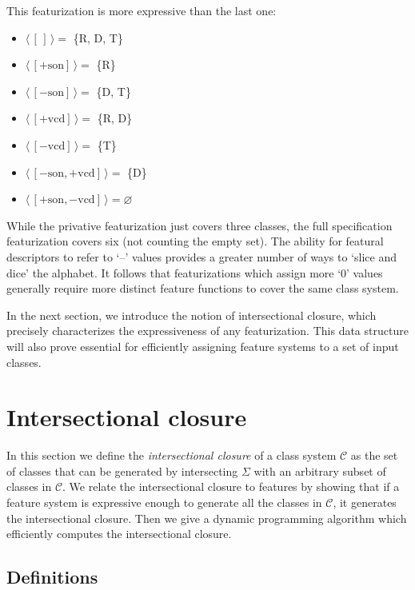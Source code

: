 \documentclass[11pt, oneside]{article}   	%
\begin{document}
\noindent This featurization is more expressive than the last one: \begin{itemize}
    \item $\langle \, [\,] \, \rangle =$ \{R, D, T\}
    \item $\langle \, [+\text{son}] \, \rangle =$ \{R\}
    \item $\langle \, [-\text{son}] \, \rangle =$ \{D, T\}
    \item $\langle \, [+\text{vcd}] \, \rangle =$ \{R, D\}
    \item $\langle \, [-\text{vcd}]  \, \rangle=$ \{T\}
    \item $\langle \, [-\text{son},+\text{vcd}] \, \rangle =$ \{D\}
    \item $\langle \, [+\text{son},-\text{vcd}] \, \rangle = \varnothing$
    \end{itemize}

\noindent While the privative featurization just covers three classes, the full specification featurization covers six (not counting the empty set). The ability for featural descriptors to refer to `--' values provides a greater number of ways to `slice and dice' the alphabet. It follows that featurizations which assign more `$0$' values generally require more distinct feature functions to cover the same class system.

\vspace{\baselineskip} In the next section, we introduce the notion of intersectional closure, which precisely characterizes the expressiveness of any featurization. This data structure will also prove essential for efficiently assigning feature systems to a set of input classes.

\FloatBarrier
\section{Intersectional closure}
\label{sec:intersectional}

In this section we define the \textit{intersectional closure} of a class system $\mathcal{C}$ as the set of classes that can be generated by intersecting $\Sigma$ with an arbitrary subset of classes in $\mathcal{C}$. We relate the intersectional closure to features by showing that if a feature system is expressive enough to generate all the classes in $\mathcal{C}$, it generates the intersectional closure. Then we give a dynamic programming algorithm which efficiently computes the intersectional closure. 

\subsection{Definitions}
\end{document}
